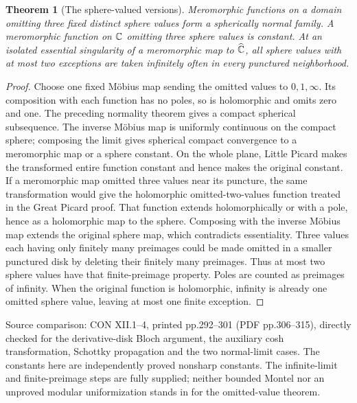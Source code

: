 \documentclass[11pt,a4paper,openany]{book}
\newtheorem{theorem}{Theorem}[chapter]
\theoremstyle{definition}
\theoremstyle{remark}\newtheorem{remark}[theorem]{Remark}
\newcommand{\family}[1]{}
\newcommand{\source}[1]{\par\begingroup\small\sffamily\color{black!65}Source comparison: #1\par\endgroup}
\begin{document}
\begin{theorem}[The sphere-valued versions]\label{d12:23-06}\family{D12.23.06}
Meromorphic functions on a domain omitting three fixed distinct sphere
values form a spherically normal family. A meromorphic function on
$\mathbb C$ omitting three sphere values is constant. At an isolated essential
singularity of a meromorphic map to $\widehat{\mathbb C}$, all sphere values with
at most two exceptions are taken infinitely often in every punctured
neighborhood.
\end{theorem}
\begin{proof}
Choose one fixed M\"obius map sending the omitted values to
$0,1,\infty$. Its composition with each function has no poles, so
is holomorphic and omits zero and one. The preceding normality theorem
gives a compact spherical subsequence. The inverse M\"obius map is
uniformly continuous on the compact sphere; composing the limit gives
spherical compact convergence to a meromorphic map or a sphere constant.
On the whole plane, Little Picard makes the transformed entire function
constant and hence makes the original constant.
If a meromorphic map omitted three values near its puncture, the same
transformation would give the holomorphic omitted-two-values function
treated in the Great Picard proof. That function extends holomorphically
or with a pole, hence as a holomorphic map to the sphere. Composing
with the inverse M\"obius map extends the original sphere map, which
contradicts essentiality. Three values each having only finitely many
preimages could be made omitted in a smaller punctured disk by deleting
their finitely many preimages. Thus at most two sphere values have
that finite-preimage property. Poles are counted as preimages of
infinity. When the original function is holomorphic, infinity is
already one omitted sphere value, leaving at most one finite exception.
\end{proof}
\source{CON XII.1--4, printed pp.292--301 (PDF pp.306--315), directly
checked for the derivative-disk Bloch argument, the auxiliary cosh
transformation, Schottky propagation and the two normal-limit cases.
The constants here are independently proved nonsharp constants. The
infinite-limit and finite-preimage steps are fully supplied; neither
bounded Montel nor an unproved modular uniformization stands in for
the omitted-value theorem.}


\backmatter
\end{document}
